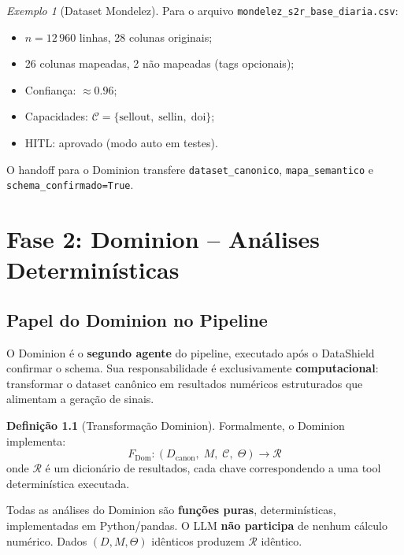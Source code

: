 \documentclass[a4paper, 12pt]{report}
\theoremstyle{definition}
\newtheorem{definicao}{Defini\c{c}\~ao}[chapter]
\theoremstyle{remark}
\newtheorem{exemplo}{Exemplo}[chapter]
\begin{document}
\begin{exemplo}[Dataset Mondelez]
  Para o arquivo \texttt{mondelez\_s2r\_base\_diaria.csv}:
  \begin{itemize}
    \item $n = 12\,960$ linhas, 28 colunas originais;
    \item 26 colunas mapeadas, 2 n\~ao mapeadas (tags opcionais);
    \item Confian\c{c}a: $\approx 0.96$;
    \item Capacidades: $\mathcal{C} = \{\text{sellout},\; \text{sellin},\; \text{doi}\}$;
    \item HITL: aprovado (modo auto em testes).
  \end{itemize}
  O handoff para o Dominion transfere
  \texttt{dataset\_canonico}, \texttt{mapa\_semantico} e
  \texttt{schema\_confirmado=True}.
\end{exemplo}


\chapter{Fase 2: Dominion -- An\'alises Determin\'isticas}

\section{Papel do Dominion no Pipeline}

O Dominion \'e o \textbf{segundo agente} do pipeline, executado ap\'os o
DataShield confirmar o schema. Sua responsabilidade \'e exclusivamente
\textbf{computacional}: transformar o dataset can\^onico em resultados
num\'ericos estruturados que alimentam a gera\c{c}\~ao de sinais.

\begin{definicao}[Transforma\c{c}\~ao Dominion]
  Formalmente, o Dominion implementa:
  \[
    F_{\text{Dom}} : (D_{\text{canon}},\; M,\; \mathcal{C},\; \Theta) \to \mathcal{R}
  \]
  onde $\mathcal{R}$ \'e um dicion\'ario de resultados, cada chave
  correspondendo a uma tool determin\'istica executada.
\end{definicao}

\begin{caixadecisao}
  Todas as an\'alises do Dominion s\~ao \textbf{fun\c{c}\~oes puras},
  determin\'isticas, implementadas em Python/pandas.
  O LLM \textbf{n\~ao participa} de nenhum c\'alculo num\'erico.
  Dados $(D, M, \Theta)$ id\^enticos produzem $\mathcal{R}$ id\^entico.
\end{caixadecisao}
\end{document}
